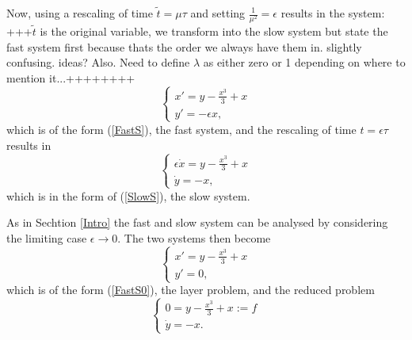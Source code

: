 Now, using a rescaling of time $ \tilde{t} = \mu \tau$ and setting $ \frac{1}{\mu^2} = \epsilon$ results in the system: \\
+++$ \tilde{t}$ is the original variable, we transform into the slow system but state the fast system first because thats the order we always have them in. slightly confusing. ideas? Also. Need to define $\lambda$ as either zero or 1 depending on where to mention it...++++++++
\begin{equation}\label{fastsystem}
    \begin{cases} x'=y-\frac{x^3}{3}+x\\
    y'=-\epsilon x,
    \end{cases}
\end{equation}
which is of the form (\ref{FastS}), the fast system, and the rescaling of time $t= \epsilon \tau$ results in 
\begin{equation}\label{slowsystem}
    \begin{cases} \epsilon \dot{x}=y-\frac{x^3}{3}+x\\
    \dot{y}=-x,
    \end{cases}
\end{equation}
which is in the form of (\ref{SlowS}), the slow system.

As in Sechtion \ref{Intro} the fast and slow system can be analysed by considering the limiting case $\epsilon \to 0$.
The two systems then become
\begin{equation}\label{fastsystem0}
    \begin{cases} x'=y-\frac{x^3}{3}+x\\
    y'=0,
    \end{cases}
\end{equation}
which is of the form (\ref{FastS0}), the layer problem, and the reduced problem 
\begin{equation}\label{slowsystem0}
    \begin{cases} 0=y-\frac{x^3}{3}+x:=f\\
    \dot{y}=-x.
    \end{cases}
\end{equation}

